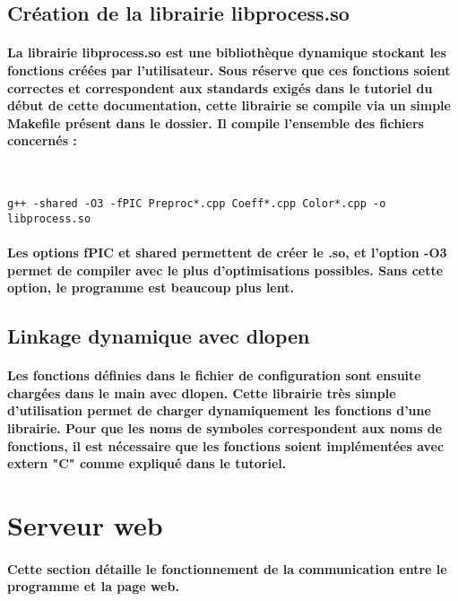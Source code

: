 \documentclass[a4paper]{article}
\begin{document}
\subsection{Création de la librairie libprocess.so} \paragraph{La librairie
libprocess.so est une bibliothèque dynamique stockant les fonctions créées par
l’utilisateur. Sous réserve que ces fonctions soient correctes et correspondent
aux standards exigés dans le tutoriel du début de cette documentation, cette
librairie se compile via un simple Makefile présent dans le dossier. Il compile
l’ensemble des fichiers concernés :} \

\begin{lstlisting}
g++ -shared -O3 -fPIC Preproc*.cpp Coeff*.cpp Color*.cpp -o libprocess.so
\end{lstlisting}

\paragraph{Les options fPIC et shared permettent de créer le .so, et l’option
-O3 permet de compiler avec le plus d’optimisations possibles. Sans cette
option, le programme est beaucoup plus lent.}

\subsection{Linkage dynamique avec dlopen} \paragraph{Les fonctions définies
dans le fichier de configuration sont ensuite chargées dans le main avec dlopen.
Cette librairie très simple d’utilisation permet de charger dynamiquement les
fonctions d’une librairie. Pour que les noms de symboles correspondent aux noms
de fonctions, il est nécessaire que les fonctions soient implémentées avec
extern "C" comme expliqué dans le tutoriel.}

\section{Serveur web} \paragraph{Cette section détaille le fonctionnement de la
communication entre le programme et la page web.}
\end{document}
